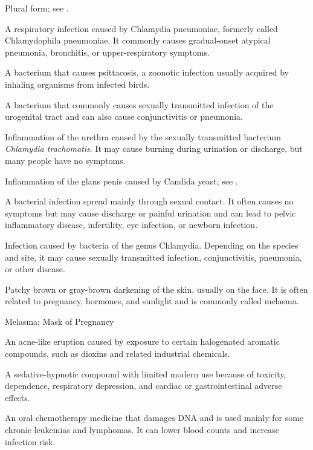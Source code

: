  Plural form; see .

 A respiratory infection caused by Chlamydia pneumoniae, formerly called Chlamydophila pneumoniae. It commonly causes gradual-onset atypical pneumonia, bronchitis, or upper-respiratory symptoms.

 A bacterium that causes psittacosis, a zoonotic infection usually acquired by inhaling organisms from infected birds.

 A bacterium that commonly causes sexually transmitted infection of the urogenital tract and can also cause conjunctivitis or pneumonia.

 Inflammation of the urethra caused by the sexually transmitted bacterium \textit{Chlamydia trachomatis}. It may cause burning during urination or discharge, but many people have no symptoms.

 Inflammation of the glans penis caused by Candida yeast; see .

 A bacterial infection spread mainly through sexual contact. It often causes no symptoms but may cause discharge or painful urination and can lead to pelvic inflammatory disease, infertility, eye infection, or newborn infection.

 Infection caused by bacteria of the genus Chlamydia. Depending on the species and site,
it may cause sexually transmitted infection, conjunctivitis, pneumonia, or other
disease.

 Patchy brown or gray-brown darkening of the skin, usually on the face. It is often related to pregnancy, hormones, and sunlight and is commonly called melasma.

\synonyms
Melasma; Mask of Pregnancy

 An acne-like eruption caused by exposure to certain halogenated aromatic compounds, such
as dioxins and related industrial chemicals.

 A sedative-hypnotic compound with limited modern use because of toxicity, dependence, respiratory depression, and cardiac or gastrointestinal adverse effects.

 An oral chemotherapy medicine that damages DNA and is used mainly for some chronic leukemias and lymphomas. It can lower blood counts and increase infection risk.


